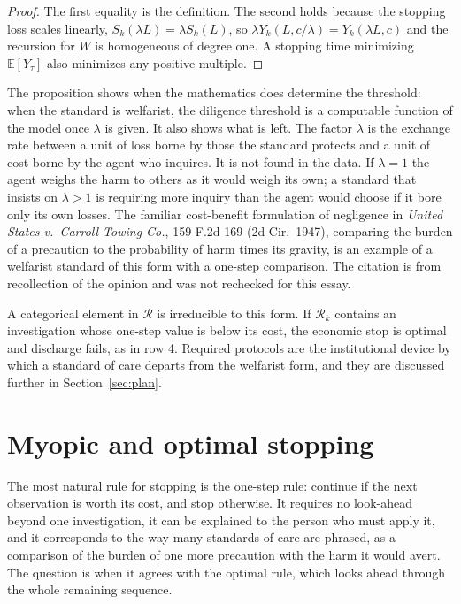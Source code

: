 \documentclass[11pt]{article}
\newcommand{\E}{\mathbb E}
\theoremstyle{plain}
\theoremstyle{definition}
\begin{document}
\begin{proof}
The first equality is the definition. The second holds because the stopping loss scales linearly, $S_k(\lambda L)=\lambda S_k(L)$, so $\lambda Y_k(L,c/\lambda)=Y_k(\lambda L,c)$ and the recursion for $W$ is homogeneous of degree one. A stopping time minimizing $\E[Y_\tau]$ also minimizes any positive multiple.
\end{proof}

The proposition shows when the mathematics does determine the threshold: when the standard is welfarist, the diligence threshold is a computable function of the model once $\lambda$ is given. It also shows what is left. The factor $\lambda$ is the exchange rate between a unit of loss borne by those the standard protects and a unit of cost borne by the agent who inquires. It is not found in the data. If $\lambda=1$ the agent weighs the harm to others as it would weigh its own; a standard that insists on $\lambda>1$ is requiring more inquiry than the agent would choose if it bore only its own losses. The familiar cost-benefit formulation of negligence in \emph{United States v.\ Carroll Towing Co.}, 159 F.2d 169 (2d Cir.\ 1947), comparing the burden of a precaution to the probability of harm times its gravity, is an example of a welfarist standard of this form with a one-step comparison. The citation is from recollection of the opinion and was not rechecked for this essay.

A categorical element in $\mathcal R$ is irreducible to this form. If $\mathcal R_k$ contains an investigation whose one-step value is below its cost, the economic stop is optimal and discharge fails, as in row 4. Required protocols are the institutional device by which a standard of care departs from the welfarist form, and they are discussed further in Section~\ref{sec:plan}.

\section{Myopic and optimal stopping}\label{sec:myopic}

The most natural rule for stopping is the one-step rule: continue if the next observation is worth its cost, and stop otherwise. It requires no look-ahead beyond one investigation, it can be explained to the person who must apply it, and it corresponds to the way many standards of care are phrased, as a comparison of the burden of one more precaution with the harm it would avert. The question is when it agrees with the optimal rule, which looks ahead through the whole remaining sequence.
\end{document}
